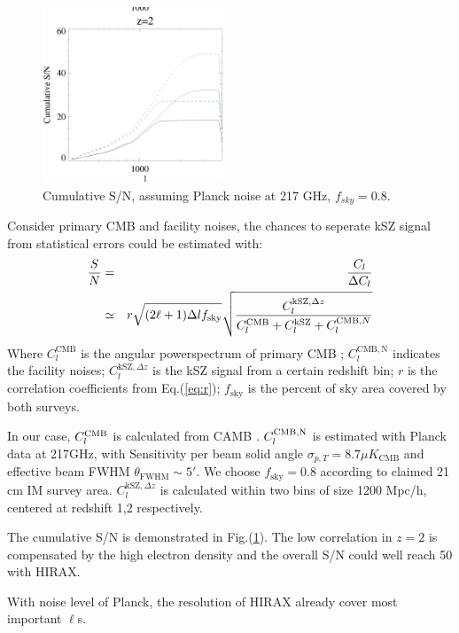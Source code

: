 \begin{figure}[tbp]
\begin{center}
\includegraphics[width=0.48\textwidth]{figure/sn_z1_z2.eps}
\end{center}
\vspace{-0.7cm}
\caption{Cumulative S/N, assuming Planck noise at 217 GHz, $f_{sky}=0.8$. 
}
\label{fig:sn}
\end{figure}
Consider primary CMB and facility noises, 
the chances to seperate kSZ signal from statistical errors could be estimated 
with:
\begin{eqnarray}
    \frac{S}{N}&=&\frac{C_l}{\Delta C_l}\\\nonumber
               &\simeq&
    r\sqrt{(2\ell+1)\Delta l f_\mathrm{sky}}\sqrt{\frac{C_l^{\mathrm{kSZ},\Delta z}}{C_l^{\mathrm{CMB}}+C_l^\mathrm{kSZ}+C_l^{\mathrm{CMB},N}}}
\end{eqnarray}
Where $C_l^\mathrm{CMB}$ is the angular powerspectrum of primary CMB 
;
$C_l^\mathrm{CMB,N}$ indicates the facility noises; 
$C_l^{\mathrm{kSZ},\Delta z}$ is the kSZ signal from a certain redshift bin; 
$r$ is the correlation coefficients from Eq.(\ref{eq:r}); 
$f_\mathrm{sky}$ is the percent of sky area covered by both surveys.

In our case, $C_l^\mathrm{CMB}$ is calculated from CAMB \cite{CAMB}. 
$C_l^\mathrm{CMB,N}$ is estimated with Planck data \cite{Planck2015} at 217GHz, with 
Sensitivity per beam solid angle $\sigma_{p,T}=8.7\mu K_\mathrm{CMB}$  
and effective beam FWHM $\theta_\mathrm{FWHM}\sim 5'$. 
We choose $f_\mathrm{sky}=0.8$ according to claimed 21 cm IM survey area. 
$C_l^{\mathrm{kSZ},\Delta z}$ is calculated within two bins of size 1200 Mpc/h, centered at redshift 1,2 respectively.

The cumulative S/N is demonstrated in Fig.(\ref{fig:sn}). 
The low correlation in $z=2$ is compensated by the high electron density 
and the overall S/N could well reach 50 with HIRAX.

With noise level of Planck, 
the resolution of HIRAX already cover most important $\ell$s. 
